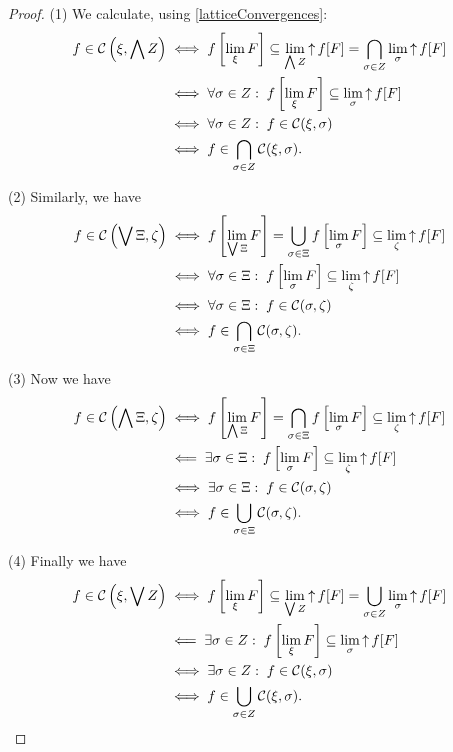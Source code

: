 \begin{proof}
(1) We calculate, using \ref{latticeConvergences}:
\begin{align*}
f \in \operatorname{\mathcal{C}}\left(\xi, \bigwedge Z\right) &\iff f\left[\lim_\xi F \right] \subseteq \lim_{\bigwedge Z} \operatorname{\uparrow} f[F] = \bigcap_{\sigma\in Z}\lim_\sigma \operatorname{\uparrow} f[F] \\
&\iff \forall \sigma\in Z: \; f\left[\lim_\xi F \right] \subseteq \lim_\sigma \operatorname{\uparrow} f[F] \\
&\iff \forall \sigma\in Z: \; f \in \operatorname{\mathcal{C}}(\xi,\sigma) \\
&\iff f\in \bigcap_{\sigma\in Z}\operatorname{\mathcal{C}}(\xi,\sigma).
\end{align*}

(2) Similarly, we have
\begin{align*}
f \in \operatorname{\mathcal{C}}\left(\bigvee \Xi, \zeta\right) &\iff f\left[\lim_{\bigvee \Xi} F \right] = \bigcup_{\sigma\in\Xi}f\left[\lim_\sigma F \right] \subseteq \lim_{\zeta} \operatorname{\uparrow} f[F] \\
&\iff \forall \sigma\in \Xi: \; f\left[\lim_\sigma F \right] \subseteq \lim_\zeta \operatorname{\uparrow} f[F] \\
&\iff \forall \sigma\in \Xi: \; f \in \operatorname{\mathcal{C}}(\sigma, \zeta) \\
&\iff f\in \bigcap_{\sigma\in \Xi}\operatorname{\mathcal{C}}(\sigma, \zeta).
\end{align*}

(3) Now we have
\begin{align*}
f \in \operatorname{\mathcal{C}}\left(\bigwedge \Xi, \zeta\right) &\iff f\left[\lim_{\bigwedge \Xi} F \right] = \bigcap_{\sigma\in\Xi}f\left[\lim_\sigma F \right] \subseteq \lim_{\zeta} \operatorname{\uparrow} f[F] \\
&\impliedby \exists \sigma\in \Xi: \; f\left[\lim_\sigma F \right] \subseteq \lim_\zeta \operatorname{\uparrow} f[F] \\
&\iff \exists \sigma\in \Xi: \; f \in \operatorname{\mathcal{C}}(\sigma, \zeta) \\
&\iff f\in \bigcup_{\sigma\in \Xi}\operatorname{\mathcal{C}}(\sigma, \zeta).
\end{align*}

(4) Finally we have
\begin{align*}
f \in \operatorname{\mathcal{C}}\left(\xi, \bigvee Z\right) &\iff f\left[\lim_\xi F \right] \subseteq \lim_{\bigvee Z} \operatorname{\uparrow} f[F] = \bigcup_{\sigma\in Z}\lim_\sigma \operatorname{\uparrow} f[F] \\
&\impliedby \exists \sigma\in Z: \; f\left[\lim_\xi F \right] \subseteq \lim_\sigma \operatorname{\uparrow} f[F] \\
&\iff \exists \sigma\in Z: \; f \in \operatorname{\mathcal{C}}(\xi,\sigma) \\
&\iff f\in \bigcup_{\sigma\in Z}\operatorname{\mathcal{C}}(\xi,\sigma).
\end{align*}
\end{proof}
